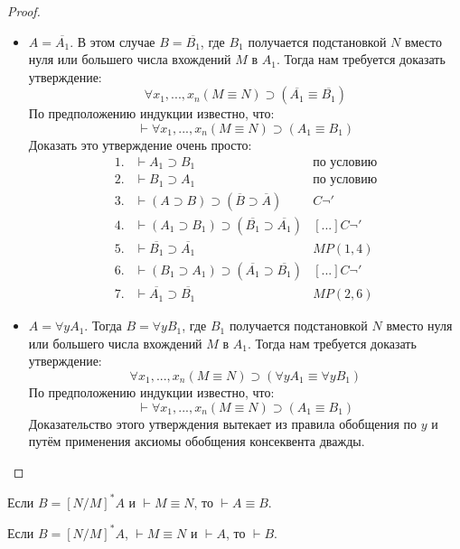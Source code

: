 \begin{proof}
\begin{itemize}
        \item $A=\overline{A_1}$. В этом случае $B=\overline{B_1}$, где $B_1$ получается подстановкой $N$ вместо нуля или большего числа вхождений $M$ в $A_1$. Тогда нам требуется доказать утверждение:
        \begin{equation*}
            \forall x_1,...,x_n (M\equiv N) \supset (\overline{A_1}\equiv\overline{B_1})
        \end{equation*} 
        По предположению индукции известно, что:
        \begin{equation*}
            \vdash \forall x_1,...,x_n (M\equiv N) \supset (A_1 \equiv B_1)
        \end{equation*}
        Доказать это утверждение очень просто:
        \begin{equation*}
            \begin{array}{lll}
                1. & \vdash A_1 \supset B_1 & \text{по условию} \\ 
                2. & \vdash B_1 \supset A_1 & \text{по условию} \\
                3. & \vdash (A \supset B) \supset (\overline{B} \supset \overline{A}) & C\lnot' \\ 
                4. & \vdash (A_1 \supset B_1) \supset (\overline{B_1} \supset \overline{A_1}) & [...]C\lnot' \\ 
                5. & \vdash \overline{B_1} \supset \overline{A_1} & MP(1, 4) \\ 
                6. & \vdash (B_1 \supset A_1) \supset (\overline{A_1} \supset \overline{B_1}) & [...]C\lnot' \\ 
                7. & \vdash \overline{A_1} \supset \overline{B_1} & MP(2, 6)
            \end{array}
        \end{equation*}

        \item $A=\forall y A_1$. Тогда $B=\forall y B_1$, где $B_1$ получается подстановкой $N$ вместо нуля или большего числа вхождений $M$ в $A_1$. Тогда нам требуется доказать утверждение:
        \begin{equation*}
            \forall x_1,...,x_n (M\equiv N) \supset (\forall y A_1\equiv\forall y B_1)
        \end{equation*} 
        По предположению индукции известно, что:
        \begin{equation*}
            \vdash \forall x_1,...,x_n (M\equiv N) \supset (A_1 \equiv B_1)
        \end{equation*}
        Доказательство этого утверждения вытекает из правила обобщения по $y$ и путём применения аксиомы обобщения консеквента дважды. \qedhere
    \end{itemize}
\end{proof}

\begin{consequence}
    Если $B=[N/M]^*A$ и $\vdash M \equiv N$, то $\vdash A \equiv B$.
\end{consequence}
\begin{consequence}
    Если $B=[N/M]^*A$, $\vdash M \equiv N$ и $\vdash A$, то $\vdash B$.
\end{consequence}